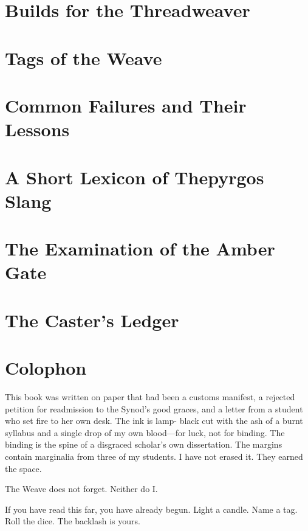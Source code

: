 \documentclass[11pt]{book}
\begin{document}
\chapter{Builds for the Threadweaver}


\chapter{Tags of the Weave}


\chapter{Common Failures and Their Lessons}


\chapter{A Short Lexicon of Thepyrgos Slang}


\chapter{The Examination of the Amber Gate}


\chapter{The Caster's Ledger}


\backmatter
\chapter*{Colophon}

This book was written on paper that had been a customs manifest, a rejected petition for readmission to the Synod's good graces, and a letter from a student who set fire to her own desk. The ink is lamp- black cut with the ash of a burnt syllabus and a single drop of my own blood---for luck, not for binding. The binding is the spine of a disgraced scholar's own dissertation. The margins contain marginalia from three of my students. I have not erased it. They earned the space.

The Weave does not forget. Neither do I.

If you have read this far, you have already begun. Light a candle. Name a tag. Roll the dice. The backlash is yours.
\end{document}
